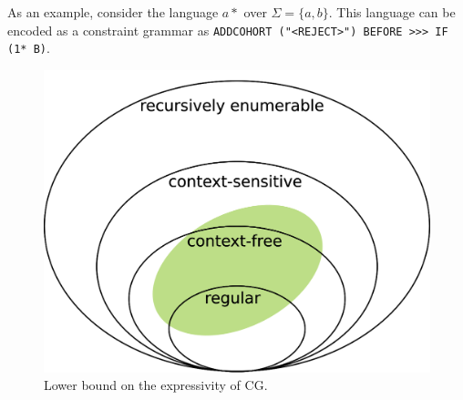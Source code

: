 \documentclass[11pt]{article}
\def\t#1{\texttt{#1}}
\def\maxAmb#1{$\langle \Sigma \rangle_#1$}
\begin{document}
As an example, consider the language $a*$ over $\Sigma = \{a,b\}$. This language
can be encoded as a constraint grammar as \texttt{ADDCOHORT ("<REJECT>") BEFORE >>> IF (1* B)}.

\def\wwf{\t{"<w>"}}
\def\swf{\t{"<s>"}}




\begin{figure}[h]
  \centering
  \includegraphics[width=0.8\linewidth]{chomsky}
  \caption{Lower bound on the expressivity of CG.}
  \label{fig:nocorr}
\end{figure}
\end{document}
